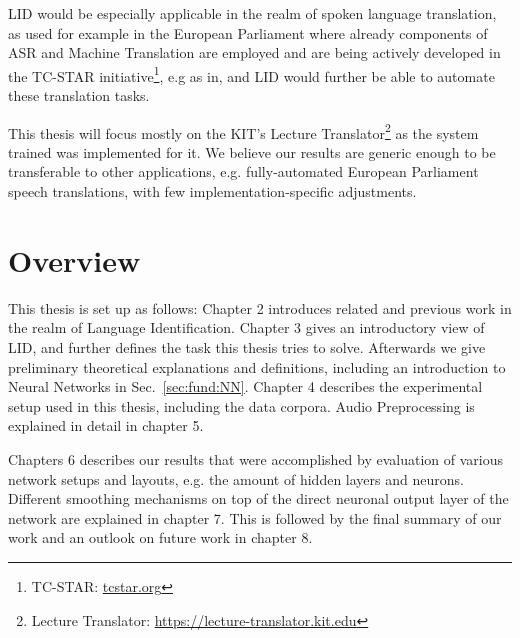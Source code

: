 LID would be especially applicable in the realm of spoken language translation, as used for example in the European Parliament where already components of ASR and Machine Translation are employed and are being actively developed in the TC-STAR initiative\footnote{TC-STAR: \url{tcstar.org}}, e.g as in\cite{vilar2005statistical}, and LID would further be able to automate these translation tasks.

This thesis will focus mostly on the KIT's Lecture Translator\footnote{Lecture Translator: \url{https://lecture-translator.kit.edu}}  as the system trained was implemented for it. We believe our results are generic enough to be transferable to other applications, e.g. fully-automated European Parliament speech translations, with few implementation-specific adjustments.

\section{Overview}
\label{sec:Intro:Overview}

This thesis is set up as follows: Chapter 2 introduces related and previous work in the realm of Language Identification. Chapter 3 gives an introductory view of LID, and further defines the task this thesis tries to solve. Afterwards we give preliminary theoretical explanations and definitions, including an introduction to Neural Networks in Sec.~\ref{sec:fund:NN}. Chapter 4 describes the experimental setup used in this thesis, including the data corpora. Audio Preprocessing is explained in detail in chapter 5.

Chapters 6 describes our results that were accomplished by evaluation of various network setups and layouts, e.g. the amount of hidden layers and neurons. Different smoothing mechanisms on top of the direct neuronal output layer of the network are explained in chapter 7. This is followed by the final summary of our work and an outlook on future work in chapter 8.